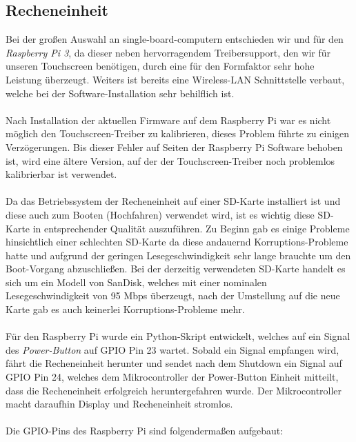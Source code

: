 \subsection{Recheneinheit}
Bei der großen Auswahl an single-board-computern entschieden wir und für den \textit{Raspberry Pi 3}, da dieser neben hervorragendem Treibersupport, den wir für unseren Touchscreen benötigen, durch eine für den Formfaktor sehr hohe Leistung überzeugt. Weiters ist bereits eine Wireless-LAN Schnittstelle verbaut, welche bei der Software-Installation sehr behilflich ist.\\
\\
Nach Installation der aktuellen Firmware auf dem Raspberry Pi war es nicht möglich den Touchscreen-Treiber zu kalibrieren, dieses Problem führte zu einigen Verzögerungen. Bis dieser Fehler auf Seiten der Raspberry Pi Software behoben ist, wird eine ältere Version, auf der der Touchscreen-Treiber noch problemlos kalibrierbar ist verwendet.\\
\\
Da das Betriebssystem der Recheneinheit auf einer SD-Karte installiert ist und diese auch zum Booten (Hochfahren) verwendet wird, ist es wichtig diese SD-Karte in entsprechender Qualität auszuführen. Zu Beginn gab es einige Probleme hinsichtlich einer schlechten SD-Karte da diese andauernd Korruptions-Probleme hatte und aufgrund der geringen Lesegeschwindigkeit sehr lange brauchte um den Boot-Vorgang abzuschließen. Bei der derzeitig verwendeten SD-Karte handelt es sich um ein Modell von SanDisk, welches mit einer nominalen Lesegeschwindigkeit von 95 Mbps überzeugt, nach der Umstellung auf die neue Karte gab es auch keinerlei Korruptions-Probleme mehr.\\
\\
Für den Raspberry Pi wurde ein Python-Skript entwickelt, welches auf ein Signal des \textit{Power-Button} auf GPIO Pin 23 wartet. Sobald ein Signal empfangen wird, fährt die Recheneinheit herunter und sendet nach dem Shutdown ein Signal auf GPIO Pin 24, welches dem Mikrocontroller der Power-Button Einheit mitteilt, dass die Recheneinheit erfolgreich heruntergefahren wurde. Der Mikrocontroller macht daraufhin Display und Recheneinheit stromlos.\\
\\
Die GPIO-Pins des Raspberry Pi sind folgendermaßen aufgebaut:\\


